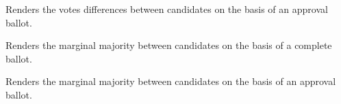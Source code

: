 \documentclass[letterpaper,10pt,english]{sphinxmanual}
\begin{document}
\begin{fulllineitems}
\begin{fulllineitems}
\end{fulllineitems}


\begin{fulllineitems}
\label{techDoc:votingDigraphs.CondorcetDigraph.constructApprovalBallotRelation}
Renders the votes differences between candidates
on the basis of an approval ballot.

\end{fulllineitems}


\begin{fulllineitems}
\label{techDoc:votingDigraphs.CondorcetDigraph.constructBallotRelation}
Renders the marginal majority between candidates
on the basis of a complete ballot.

\end{fulllineitems}


\begin{fulllineitems}
\label{techDoc:votingDigraphs.CondorcetDigraph.constructMajorityMarginsRelation}
Renders the marginal majority between candidates
on the basis of an approval ballot.

\end{fulllineitems}


\end{fulllineitems}

\end{document}
